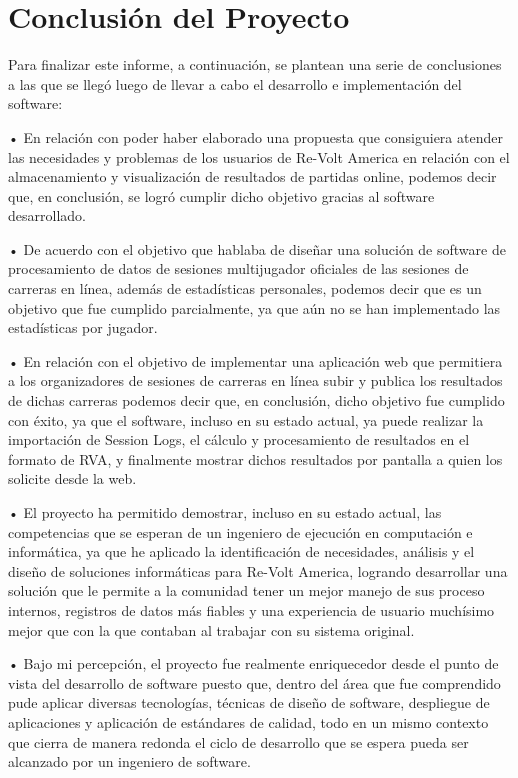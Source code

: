 \chapter{Conclusión del Proyecto}

Para finalizar este informe, a continuación, se plantean una serie de conclusiones a las que se llegó luego de llevar a cabo el desarrollo e implementación del software:

•	En relación con poder haber elaborado una propuesta que consiguiera atender las necesidades y problemas de los usuarios de Re-Volt America en relación con el almacenamiento y visualización de resultados de partidas online, podemos decir que, en conclusión, se logró cumplir dicho objetivo gracias al software desarrollado.

•	 De acuerdo con el objetivo que hablaba de diseñar una solución de software de procesamiento de datos de sesiones multijugador oficiales de las sesiones de carreras en línea, además de estadísticas personales, podemos decir que es un objetivo que fue cumplido parcialmente, ya que aún no se han implementado las estadísticas por jugador.

•	En relación con el objetivo de implementar una aplicación web que permitiera a los organizadores de sesiones de carreras en línea subir y publica los resultados de dichas carreras podemos decir que, en conclusión, dicho objetivo fue cumplido con éxito, ya que el software, incluso en su estado actual, ya puede realizar la importación de Session Logs, el cálculo y procesamiento de resultados en el formato de RVA, y finalmente mostrar dichos resultados por pantalla a quien los solicite desde la web.

•	El proyecto ha permitido demostrar, incluso en su estado actual, las competencias que se esperan de un ingeniero de ejecución en computación e informática, ya que he aplicado la identificación de necesidades, análisis y el diseño de soluciones informáticas para Re-Volt America, logrando desarrollar una solución que le permite a la comunidad tener un mejor manejo de sus proceso internos, registros de datos más fiables y una experiencia de usuario muchísimo mejor que con la que contaban al trabajar con su sistema original. 

•	Bajo mi percepción, el proyecto fue realmente enriquecedor desde el punto de vista del desarrollo de software puesto que, dentro del área que fue comprendido pude aplicar diversas tecnologías, técnicas de diseño de software, despliegue de aplicaciones y aplicación de estándares de calidad, todo en un mismo contexto que cierra de manera redonda el ciclo de desarrollo que se espera pueda ser alcanzado por un ingeniero de software.

